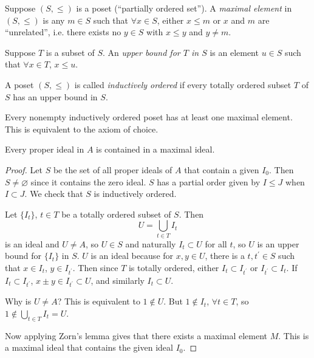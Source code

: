 Suppose $(S, \leq)$ is a poset (``partially ordered set''). A
\emph{maximal element} in $(S, \leq)$ is any $m \in S$ such that
$\forall x \in S$, either $x \leq m$ or $x$ and $m$ are ``unrelated'',
i.e. there exists no $y \in S$ with $x \leq y$ and $y \neq m$.

Suppose $T$ is a subset of $S$. An \emph{upper bound for $T$ in $S$}
is an element $u \in S$ such that $\forall x \in T$, $x \leq u$.

\begin{defn}
A poset $(S, \leq)$ is called \emph{inductively ordered} if
every totally ordered subset $T$ of $S$ has an upper bound in $S$.
\end{defn}

\begin{lemma}
Every nonempty inductively ordered poset has at least one maximal
element. This is equivalent to the axiom of choice.
\end{lemma}

\begin{theorem}[?, redux]
Every proper ideal in $A$ is contained in a maximal ideal.
\end{theorem}

\begin{proof}
Let $S$ be the set of all proper ideals of $A$ that contain a given
$I_0$.
Then $S \neq \varnothing$ since it contains the zero ideal. $S$ has a
partial order given by $I \leq J$ when $I \subset J$. We check that
$S$ is inductively ordered.

Let $\{I_t\}$, $t \in T$ be a totally ordered subset of $S$. Then
$$
U = \bigcup_{t \in T} I_t
$$
is an ideal and $U \neq A$, so $U \in S$ and naturally $I_t \subset U$
for all $t$, so $U$ is an upper bound for $\{I_t\}$ in $S$. $U$ is an
ideal because for $x, y \in U$, there is a $t, t^\prime \in S$ such
that $x \in I_t$, $y \in I_{t^\prime}$. Then since $T$ is totally
ordered, either $I_t \subset I_{t^\prime}$ or $I_{t^\prime} \subset
I_t$. If$I_t \subset I_{t^\prime}$, $x \pm y \in I_{t^\prime} \subset U$, and
similarly $I_t \subset U$.

Why is $U \neq A$? This is equivalent to $1 \notin U$. But $1 \notin
I_t$, $\forall t \in T$, so $1 \notin \bigcup_{t \in T} I_t = U$.

Now applying Zorn's lemma gives that there exists a maximal element
$M$. This is a maximal ideal that contains the given ideal $I_0$.
\end{proof}


